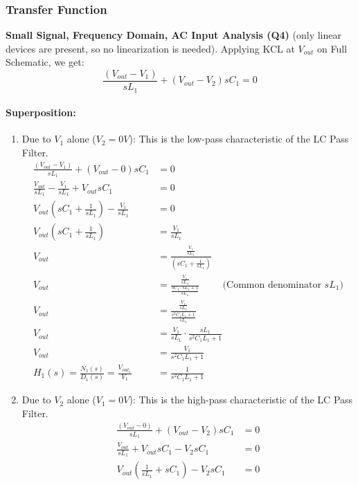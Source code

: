 \subsubsection{Transfer Function}
\textbf{Small Signal, Frequency Domain, AC Input Analysis (Q4)} (only
linear devices are present, so no linearization is needed). Applying KCL
at $V_{out}$ on Full Schematic, we get:
\[
  \frac{(V_{out} - V_{1})}{sL_1} + (V_{out} - V_{2}){sC_1} = 0
\]
\paragraph{Superposition:}
\begin{enumerate}
  \item Due to \(V_{1}\) alone (\(V_{2} = 0V\)):
    This is the low-pass characteristic of the LC Pass Filter.
    \begin{align*}
      \frac{(V_{out} - V_{1})}{sL_1} + (V_{out} - 0)sC_1 &= 0 \\
      \frac{V_{out}}{sL_1} - \frac{V_{1}}{sL_1} + V_{out}sC_1 &= 0 \\
      V_{out}(sC_1 + \frac{1}{sL_1}) - \frac{V_{1}}{sL_1} &= 0 \\
      V_{out}(sC_1 + \frac{1}{sL_1}) &= \frac{V_{1}}{sL_1} \\
      V_{out} &= \frac{\frac{V_{1}}{sL_1}}{(sC_1 + \frac{1}{sL_1})} \\
      V_{out} &= \frac{\frac{V_{1}}{sL_1}}{\frac{sC_1 \cdot sL_1 + 1}{sL_1}} \hspace{1cm} \text{(Common denominator \(sL_1\))} \\
      V_{out} &= \frac{\frac{V_{1}}{sL_1}}{\frac{s^2C_1L_1 + 1}{sL_1}} \\
      V_{out} &= \frac{V_{1}}{sL_1} \cdot \frac{sL_1}{s^2C_1L_1 + 1} \\
      V_{out} &= \frac{V_{1}}{s^2C_1L_1 + 1} \\
      H_1(s) = \frac{N_1(s)}{D_1(s)} = \frac{V_{out_1}}{V_{1}} &= \frac{1}{s^2C_1L_1 + 1}
    \end{align*}
  \item Due to \(V_{2}\) alone (\(V_{1} = 0V\)):
    This is the high-pass characteristic of the LC Pass Filter.
    \begin{align*}
      \frac{(V_{out} - 0)}{sL_1} + (V_{out} - V_{2})sC_1 &= 0 \\
      \frac{V_{out}}{sL_1} + V_{out}sC_1 - V_{2}sC_1 &= 0 \\
      V_{out}(\frac{1}{sL_1} + sC_1) - V_{2}sC_1 &= 0 \\

\end{align*}
\end{enumerate}
